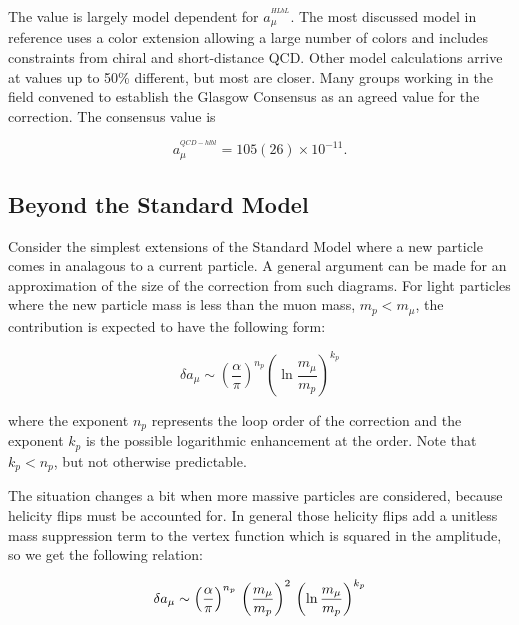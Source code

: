 The value is largely model dependent for $a_\mu^{^{HLbL}}$.  The most discussed model in reference\cite{amm-of-muon} uses a color extension allowing a large number of colors and includes constraints from chiral and short-distance QCD.  Other model calculations arrive at values up to 50\% different, but most are closer.  Many groups working in the field convened to establish the Glasgow Consensus as an agreed value for the correction\cite{e989-tdr}.  The consensus value is

\begin{equation}
\label{eqn:qcd-hlbl-total}
a_\mu^{^{QCD-hlbl}} = 105(26) \times 10^{-11}.
\end{equation}

\subsection{Beyond the Standard Model}

Consider the simplest extensions of the Standard Model where a new particle comes in analagous to a current particle.  A general argument can be made for an approximation of the size of the correction from such diagrams\cite{the-muon-g-2}.  For light particles where the new particle mass is less than the muon mass, $m_p < m_\mu$, the contribution is expected to have the following form:

\begin{equation}
\label{eqn:bsm-general-small-m}
\delta a_\mu \sim \left(\frac{\alpha}{\pi}\right)^{n_p} \left( \ln{\frac{m_\mu}{m_p}} \right)^{k_p}
\end{equation}

\noindent
where the exponent $n_p$ represents the loop order of the correction and the exponent $k_p$ is the possible logarithmic enhancement at the order.  Note that $k_p < n_p$, but not otherwise predictable.

The situation changes a bit when more massive particles are considered, because helicity flips must be accounted for.  In general those helicity flips add a unitless mass suppression term to the vertex function which is squared in the amplitude, so we get the following relation:

\begin{equation}
\label{eqn:bsm-general-large-m}
\delta a_\mu \sim \left(\frac{\alpha}{\pi}\right)^{n_p} \\
\left(\frac{m_\mu}{m_p}\right)^2 \\
\left(\ln{\frac{m_\mu}{m_p}} \right)^{k_p}
\end{equation}

